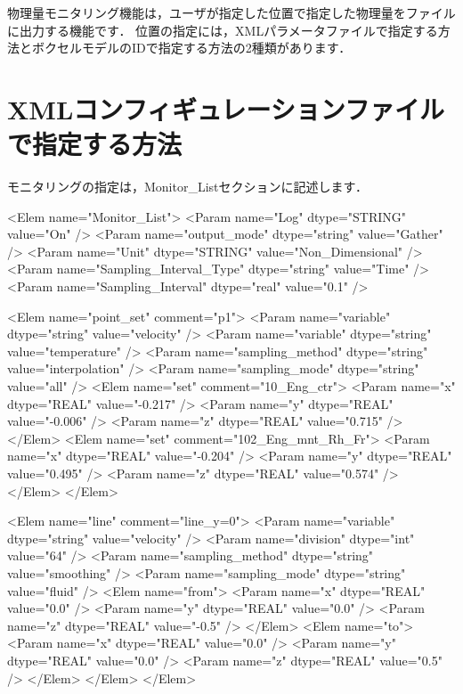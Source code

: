 \graphicspath{{./fig_Monitor/}}


物理量モニタリング機能は，ユーザが指定した位置で指定した物理量をファイルに出力する機能です．
位置の指定には，XMLパラメータファイルで指定する方法とボクセルモデルのIDで指定する方法の2種類があります．


\section{XMLコンフィギュレーションファイルで指定する方法}
モニタリングの指定は，Monitor\_Listセクションに記述します．

{\small
\begin{program}
<Elem name="Monitor_List"> 
  <Param name="Log"                    dtype="STRING" value="On" />
  <Param name="output_mode"            dtype="string" value="Gather" />
  <Param name="Unit"                   dtype="STRING" value="Non_Dimensional" />
  <Param name="Sampling_Interval_Type" dtype="string" value="Time" />
  <Param name="Sampling_Interval"      dtype="real"   value="0.1" />
  
  <Elem name="point_set" comment="p1"> 
    <Param name="variable" dtype="string" value="velocity" /> 
    <Param name="variable" dtype="string" value="temperature" /> 
    <Param name="sampling_method" dtype="string" value="interpolation" /> 
    <Param name="sampling_mode"   dtype="string" value="all" /> 
    <Elem name="set" comment="10_Eng_ctr">
      <Param name="x" dtype="REAL" value="-0.217" /> 
      <Param name="y" dtype="REAL" value="-0.006" /> 
      <Param name="z" dtype="REAL" value="0.715" /> 
    </Elem> 
    <Elem name="set" comment="102_Eng_mnt_Rh_Fr"> 
      <Param name="x" dtype="REAL" value="-0.204" /> 
      <Param name="y" dtype="REAL" value="0.495" /> 
      <Param name="z" dtype="REAL" value="0.574" /> 
    </Elem> 
  </Elem> 

  <Elem name="line" comment="line_y=0"> 
    <Param name="variable" dtype="string" value="velocity" /> 
    <Param name="division" dtype="int" value="64" /> 
    <Param name="sampling_method" dtype="string" value="smoothing" /> 
    <Param name="sampling_mode"   dtype="string" value="fluid" /> 
    <Elem name="from"> 
      <Param name="x" dtype="REAL" value="0.0" /> 
      <Param name="y" dtype="REAL" value="0.0" /> 
      <Param name="z" dtype="REAL" value="-0.5" /> 
    </Elem> 
    <Elem name="to"> 
      <Param name="x" dtype="REAL" value="0.0" /> 
      <Param name="y" dtype="REAL" value="0.0" /> 
      <Param name="z" dtype="REAL" value="0.5" /> 
    </Elem> 
  </Elem> 
</Elem> 
\end{program}
}


